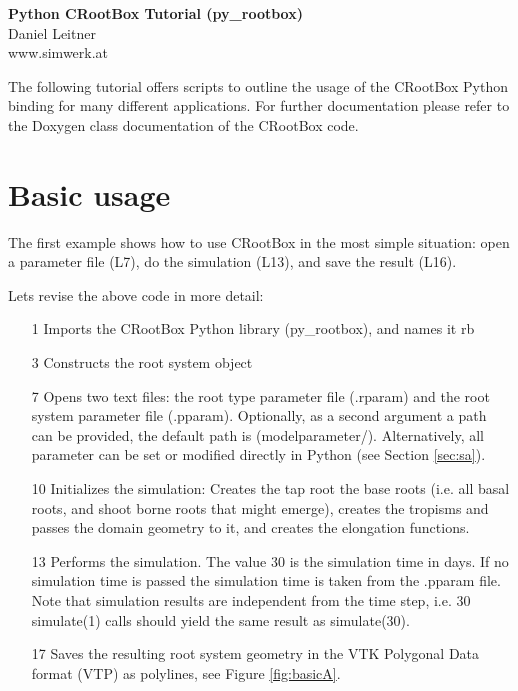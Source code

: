 \documentclass[a4paper]{article}
\begin{document}
\begin{center}
\vspace{0.5 cm}
\huge{\textbf{Python CRootBox Tutorial (py\_rootbox)}} \\
\vspace{0.5 cm}
\normalsize
Daniel Leitner \\
www.simwerk.at 
\end{center}

\vspace{0.5 cm}

\noindent 
The following tutorial offers scripts to outline the usage of the CRootBox Python binding for many different applications. 
For further documentation please refer to the Doxygen class documentation of the CRootBox code.


\vspace{0.5 cm}

\tableofcontents

\newpage



\section{Basic usage}
 
The first example shows how to use CRootBox in the most simple situation: open a parameter file (L7), do the simulation (L13), and save the result (L16). 


\noindent 
Lets revise the above code in more detail: 
\begin{itemize}
 \item[1] Imports the CRootBox Python library (py\_rootbox), and names it rb
 \item[3] Constructs the root system object
 \item[7] Opens two text files: the root type parameter file (.rparam) and the root system parameter file (.pparam). Optionally, as a second argument a path can be provided, the default path is (modelparameter/). 
 Alternatively, all parameter can be set or modified directly in Python (see Section \ref{sec:sa}).
 \item[10] Initializes the simulation: Creates the tap root the base roots (i.e. all basal roots, and shoot borne roots that might emerge), creates the tropisms and passes the domain geometry to it, and creates the elongation functions. 
 \item[13] Performs the simulation. The value 30 is the simulation time in days. If no simulation time is passed the simulation time is taken from the .pparam file. Note that simulation results are independent from the time step, 
 i.e. 30 simulate(1) calls should yield the same result as simulate(30). 
 \item[17] Saves the resulting root system geometry in the VTK Polygonal Data format (VTP) as polylines, see Figure \ref{fig:basicA}. 
\end{itemize}
\end{document}
